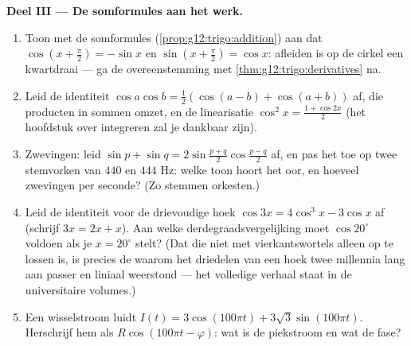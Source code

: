 \begin{problem}
\medskip
\noindent\textbf{Deel III --- De somformules aan het werk.}
\begin{enumerate}[resume]
  \item Toon met de somformules (\cref{prop:g12:trigo:addition}) aan dat
        $\cos\left(x + \frac\pi2\right) = -\sin x$ en
        $\sin\left(x + \frac\pi2\right) = \cos x$: afleiden is op de cirkel
        een kwartdraai --- ga de overeenstemming met
        \cref{thm:g12:trigo:derivatives} na.
  \item Leid de identiteit
        $\cos a \cos b = \frac12\left(\cos(a - b) + \cos(a + b)\right)$ af,
        die producten in sommen omzet, en de linearisatie
        $\cos^2 x = \frac{1 + \cos 2x}{2}$ (het hoofdstuk over integreren zal
        je dankbaar zijn).
  \item Zwevingen: leid $\sin p + \sin q = 2 \sin\frac{p + q}{2}
        \cos\frac{p - q}{2}$ af, en pas het toe op twee stemvorken van $440$
        en $444$ Hz: welke toon hoort het oor, en hoeveel zwevingen per
        seconde? (Zo stemmen orkesten.)
  \item Leid de identiteit voor de drievoudige hoek
        $\cos 3x = 4\cos^3 x - 3\cos x$ af (schrijf $3x = 2x + x$). Aan welke
        derdegraadsvergelijking moet $\cos 20^\circ$ voldoen als je
        $x = 20^\circ$ stelt? (Dat die  niet met vierkantswortels
        alleen op te lossen is, is precies de  waarom het driedelen van
        een hoek twee millennia lang aan passer en liniaal weerstond --- het
        volledige verhaal staat in de universitaire volumes.)
  \item Een wisselstroom luidt
        $I(t) = 3\cos(100\pi t) + 3\sqrt3 \sin(100\pi t)$. Herschrijf hem als
        $R\cos(100\pi t - \varphi)$: wat is de piekstroom en wat de fase?
\end{enumerate}


\end{problem}
